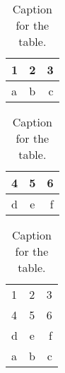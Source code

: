 %
\begin{table}[htbp]
  \centering
  \caption{Caption for the table.}
  \label{tab:table1231}
  \begin{tabular}{l|c||r}
    1 & 2 & 3\\
    \hline
    a & b & c\\
  \end{tabular}
\end{table}
%
\begin{table}[htbp]
  \centering
  \caption{Caption for the table.}
  \label{tab:table1232}
  \begin{tabular}{l|c||r}
    4 & 5 & 6\\
    \hline
    d & e & f\\
  \end{tabular}
\end{table}
%
\begin{table}[htbp]
  \centering
  \caption{Caption for the table.}
  \label{tab:table1233}
  \begin{tabular}{l|c||r}
    1 & 2 & 3\\
    4 & 5 & 6\\
    \hline
    d & e & f\\
    a & b & c\\
  \end{tabular}
\end{table}
